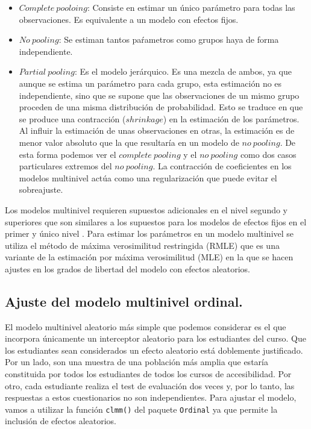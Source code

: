 \documentclass[
  12pt,
  a4paper,
  extrafontsizes,
  onecolumn,
  openright]{memoir}
\providecommand{\tightlist}{%
  \setlength{\itemsep}{0pt}\setlength{\parskip}{0pt}}\usepackage{longtable,booktabs,array}
\begin{document}
\begin{itemize}
\tightlist
\item
  \(Complete\ pooloing\): Consiste en estimar un único parámetro para
  todas las observaciones. Es equivalente a un modelo con efectos fijos.
\item
  \(No\ pooling\): Se estiman tantos paŕametros como grupos haya de
  forma independiente.
\item
  \(Partial\ pooling\): Es el modelo jerárquico. Es una mezcla de ambos,
  ya que aunque se estima un parámetro para cada grupo, esta estimación
  no es independiente, sino que se supone que las observaciones de un
  mismo grupo proceden de una misma distribución de probabilidad. Esto
  se traduce en que se produce una contracción (\(shrinkage\)) en la
  estimación de los parámetros. Al influir la estimación de unas
  observaciones en otras, la estimación es de menor valor absoluto que
  la que resultaría en un modelo de \(no\ pooling\). De esta forma
  podemos ver el \(complete\ pooling\) y el \(no\ pooling\) como dos
  casos particulares extremos del \(no\ pooling\). La contracción de
  coeficientes en los modelos multinivel actúa como una regularización
  que puede evitar el sobreajuste.
\end{itemize}

Los modelos multinivel requieren supuestos adicionales en el nivel
segundo y superiores que son similares a los supuestos para los modelos
de efectos fijos en el primer y único nivel
\autocite[ver][pp.~43]{chen2021}. Para estimar los parámetros en un
modelo multinivel se utiliza el método de máxima verosimilitud
restringida (RMLE) que es una variante de la estimación por máxima
verosimilitud (MLE) en la que se hacen ajustes en los grados de libertad
del modelo con efectos aleatorios.

\hypertarget{ajuste-del-modelo-multinivel-ordinal.}{%
\subsection{Ajuste del modelo multinivel
ordinal.}\label{ajuste-del-modelo-multinivel-ordinal.}}

El modelo multinivel aleatorio más simple que podemos considerar es el
que incorpora únicamente un interceptor aleatorio para los estudiantes
del curso. Que los estudiantes sean considerados un efecto aleatorio
está doblemente justificado. Por un lado, son una muestra de una
población más amplia que estaría constituida por todos los estudiantes
de todos los cursos de accesibilidad. Por otro, cada estudiante realiza
el test de evaluación dos veces y, por lo tanto, las respuestas a estos
cuestionarios no son independientes. Para ajustar el modelo, vamos a
utilizar la función \texttt{clmm()} del paquete \texttt{Ordinal} ya que
permite la inclusión de efectos aleatorios.
\end{document}
